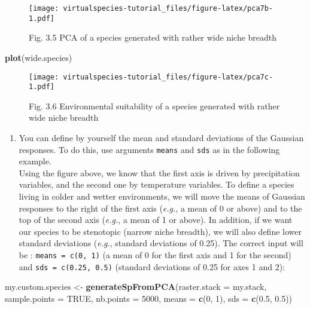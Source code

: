 \documentclass[]{article}
\newenvironment{Shaded}{\begin{snugshade}}{\end{snugshade}}
\newcommand{\KeywordTok}[1]{\textcolor[rgb]{0.13,0.29,0.53}{\textbf{#1}}}
\newcommand{\DataTypeTok}[1]{\textcolor[rgb]{0.13,0.29,0.53}{#1}}
\newcommand{\DecValTok}[1]{\textcolor[rgb]{0.00,0.00,0.81}{#1}}
\newcommand{\FloatTok}[1]{\textcolor[rgb]{0.00,0.00,0.81}{#1}}
\newcommand{\StringTok}[1]{\textcolor[rgb]{0.31,0.60,0.02}{#1}}
\newcommand{\OtherTok}[1]{\textcolor[rgb]{0.56,0.35,0.01}{#1}}
\newcommand{\NormalTok}[1]{#1}
\providecommand{\tightlist}{%
  \setlength{\itemsep}{0pt}\setlength{\parskip}{0pt}}
\begin{document}
\begin{figure}
\centering
\texttt{[image: virtualspecies-tutorial\_files/figure-latex/pca7b-1.pdf]}
\caption{Fig. 3.5 PCA of a species generated with rather wide niche
breadth}
\end{figure}

\begin{Shaded}
\begin{Highlighting}[]
\KeywordTok{plot}\NormalTok{(wide.species)}
\end{Highlighting}
\end{Shaded}

\begin{figure}
\centering
\texttt{[image: virtualspecies-tutorial\_files/figure-latex/pca7c-1.pdf]}
\caption{Fig. 3.6 Environmental suitability of a species generated with
rather wide niche breadth}
\end{figure}

\begin{enumerate}
\def\labelenumi{\arabic{enumi}.}
\setcounter{enumi}{1}
\tightlist
\item
  You can define by yourself the mean and standard deviations of the
  Gaussian responses. To do this, use arguments \texttt{means} and
  \texttt{sds} as in the following example.\\
  Using the figure above, we know that the first axis is driven by
  precipitation variables, and the second one by temperature variables.
  To define a species living in colder and wetter environments, we will
  move the means of Gaussian responses to the right of the first axis
  (\emph{e.g.}, a mean of 0 or above) and to the top of the second axis
  (\emph{e.g.}, a mean of 1 or above). In addition, if we want our
  species to be stenotopic (narrow niche breadth), we will also define
  lower standard deviations (\emph{e.g.}, standard deviations of 0.25).
  The correct input will be : \texttt{means\ =\ c(0,\ 1)} (a mean of 0
  for the first axis and 1 for the second) and
  \texttt{sds\ =\ c(0.25,\ 0.5)} (standard deviations of 0.25 for axes 1
  and 2):
\end{enumerate}

\begin{Shaded}
\begin{Highlighting}[]
\NormalTok{my.custom.species <-}\StringTok{ }\KeywordTok{generateSpFromPCA}\NormalTok{(}\DataTypeTok{raster.stack =}\NormalTok{ my.stack, }\DataTypeTok{sample.points =} \OtherTok{TRUE}\NormalTok{,}
                                       \DataTypeTok{nb.points =} \DecValTok{5000}\NormalTok{,}
                                       \DataTypeTok{means =} \KeywordTok{c}\NormalTok{(}\DecValTok{0}\NormalTok{, }\DecValTok{1}\NormalTok{), }\DataTypeTok{sds =} \KeywordTok{c}\NormalTok{(}\FloatTok{0.5}\NormalTok{, }\FloatTok{0.5}\NormalTok{))}
\end{Highlighting}
\end{Shaded}
\end{document}
